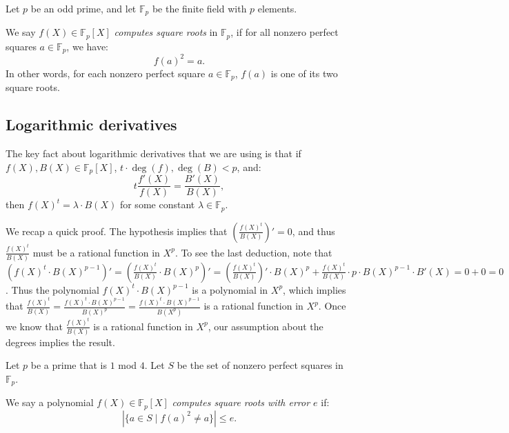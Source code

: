 \documentclass[10pt,a4paper]{article}
\newcommand{\F}{\mathbb{F}}
\begin{document}
Let $p$ be an odd prime, and let $\F_p$ be the finite field with $p$ elements.

We say $f(X) \in \F_p[X]$ {\em computes square roots} in $\F_p$, if
for all nonzero perfect squares $a \in \F_p$, we have:
$$f(a)^2 = a.$$ In other words, for each nonzero perfect square $a \in \F_p$, $f(a)$ is one of its two square roots.

\subsection*{Logarithmic derivatives}\label{sec:rem}
 The key fact about logarithmic derivatives that we are using is that if 
 $f(X), B(X) \in \F_p[X]$, $t \cdot \deg(f), \deg(B) < p$, and:
 $$ t \frac{f'(X)}{f(X)} = \frac{B'(X)}{B(X)},$$
 then $f(X)^t = \lambda \cdot B(X)$ for some constant $\lambda \in \F_p$. 
 
 We recap a quick proof. The hypothesis implies that $\left( \frac{f(X)^t}{B(X)} \right)' = 0$,
  and thus $\frac{f(X)^t}{B(X)}$ must be a rational function in $X^p$. To see the last deduction, note that $\left(f(X)^t \cdot B(X)^{p-1} \right)' = \left( \frac{f(X)^t}{B(X)} \cdot B(X)^p \right)' = \left( \frac{f(X)^t}{B(X)} \right)' \cdot B(X)^p + \frac{f(X)^t}{B(X)} \cdot p \cdot B(X)^{p-1} \cdot B'(X) = 0 + 0 = 0$. Thus the polynomial $f(X)^t \cdot B(X)^{p-1}$ is a polynomial in $X^p$, which implies that $\frac{f(X)^t}{B(X)} = 
 \frac{f(X)^t \cdot B(X)^{p-1}}{B(X)^p} =
 \frac{f(X)^t \cdot B(X)^{p-1}}{B(X^p)}$ is a rational function in $X^p$. 
 Once we know that $\frac{f(X)^t}{B(X)}$ is a rational function in $X^p$, our assumption about the degrees implies the result. 

Let $p$ be a prime that is $1$ mod $4$. 
Let $S$ be the set of nonzero perfect squares in $\F_p$.

We say a polynomial $f(X) \in \F_p[X]$ {\em computes square roots with error $e$} if:
$$ \left|\{a \in S \mid f(a)^2 \neq a  \}\right| \leq e.$$
\end{document}
